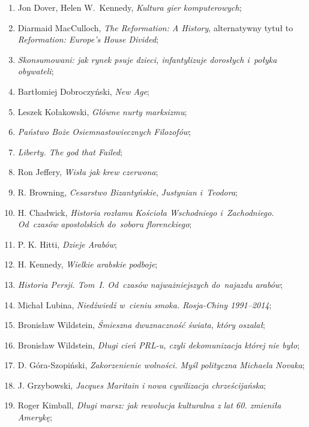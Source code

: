 \documentclass[a4paper,11pt]{article}
\begin{document}
\begin{enumerate}
\item Jon Dover, Helen W.~Kennedy, \emph{Kultura gier komputerowych};

\item Diarmaid MacCulloch, \emph{The Reformation: A History},
  alternatywny tytuł to \emph{Reformation: Europe's House Divided};

\item \emph{Skonsumowani: jak rynek psuje dzieci, infantylizuje dorosłych
  i~połyka obywateli};

\item Bartłomiej Dobroczyński, \emph{New Age};

\item Leszek Kołakowski, \emph{Główne nurty marksizmu};

\item \emph{Państwo Boże Osiemnastowiecznych Filozofów};

\item \emph{Liberty. The god that Failed};

\item Ron Jeffery, \emph{Wisła jak krew czerwona};

\item R. Browning, \emph{Cesarstwo Bizantyńskie}, \emph{Justynian
    i~Teodora};

\item H. Chadwick, \emph{Historia rozłamu Kościoła Wschodniego
    i~Zachodniego. Od~czasów apostolskich do~soboru florenckiego};

\item P. K. Hitti, \emph{Dzieje Arabów};

\item H. Kennedy, \emph{Wielkie arabskie podboje};

\item \emph{Historia Persji. Tom~I. Od~czasów najważniejszych
    do~najazdu arabów};

\item Michał Lubina, \emph{Niedźwiedź w~cieniu smoka. Rosja-Chiny
    1991--2014};

\item Bronisław Wildstein, \emph{Śmieszna dwuznaczność świata, który
    oszalał};

\item Bronisław Wildstein, \emph{Długi cień PRL-u, czyli dekomunizacja
    której nie było};

\item D. Góra-Szopiński, \emph{Zakorzenienie wolności. Myśl polityczna
    Michaela Novaka};

\item J. Grzybowski, \emph{Jacques Maritain i nowa cywilizacja
    chrześcijańska};

\item Roger Kimball, \emph{Długi marsz: jak rewolucja kulturalna z lat
    60. zmieniła Amerykę};






\end{enumerate}
\end{document}
